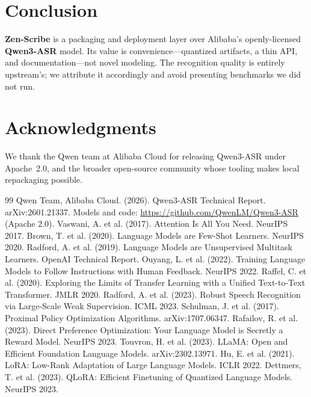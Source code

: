 \documentclass[11pt,a4paper]{article}
\begin{document}
\section{Conclusion}

\textbf{Zen-Scribe} is a packaging and deployment layer over Alibaba's openly-licensed
\textbf{Qwen3-ASR} model. Its value is convenience---quantized artifacts, a thin API,
and documentation---not novel modeling. The recognition quality is entirely upstream's;
we attribute it accordingly and avoid presenting benchmarks we did not run.

\section*{Acknowledgments}

We thank the Qwen team at Alibaba Cloud for releasing Qwen3-ASR under Apache~2.0, and
the broader open-source community whose tooling makes local repackaging possible.

\begin{thebibliography}{99}
 Qwen Team, Alibaba Cloud. (2026). Qwen3-ASR Technical Report. arXiv:2601.21337. Models and code: \url{https://github.com/QwenLM/Qwen3-ASR} (Apache 2.0).
 Vaswani, A. et al. (2017). Attention Is All You Need. NeurIPS 2017.
 Brown, T. et al. (2020). Language Models are Few-Shot Learners. NeurIPS 2020.
 Radford, A. et al. (2019). Language Models are Unsupervised Multitask Learners. OpenAI Technical Report.
 Ouyang, L. et al. (2022). Training Language Models to Follow Instructions with Human Feedback. NeurIPS 2022.
 Raffel, C. et al. (2020). Exploring the Limits of Transfer Learning with a Unified Text-to-Text Transformer. JMLR 2020.
 Radford, A. et al. (2023). Robust Speech Recognition via Large-Scale Weak Supervision. ICML 2023.
 Schulman, J. et al. (2017). Proximal Policy Optimization Algorithms. arXiv:1707.06347.
 Rafailov, R. et al. (2023). Direct Preference Optimization: Your Language Model is Secretly a Reward Model. NeurIPS 2023.
 Touvron, H. et al. (2023). LLaMA: Open and Efficient Foundation Language Models. arXiv:2302.13971.
 Hu, E. et al. (2021). LoRA: Low-Rank Adaptation of Large Language Models. ICLR 2022.
 Dettmers, T. et al. (2023). QLoRA: Efficient Finetuning of Quantized Language Models. NeurIPS 2023.
\end{thebibliography}
\end{document}

